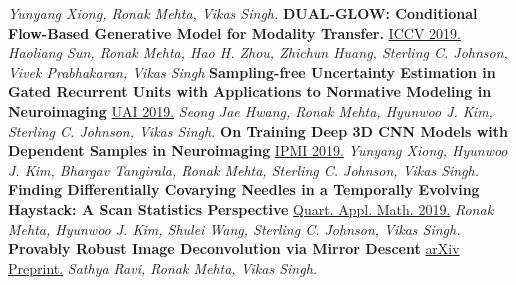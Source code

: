 \documentclass[]{article}
\begin{document}
\textit{Yunyang Xiong, Ronak Mehta, Vikas Singh.}
\newline\newline
{\bf  DUAL-GLOW: Conditional Flow-Based Generative Model for Modality Transfer.}
\newline
\href{http://openaccess.thecvf.com/content_ICCV_2019/html/Sun_DUAL-GLOW_Conditional_Flow-Based_Generative_Model_for_Modality_Transfer_ICCV_2019_paper.html}{ICCV 2019.}
\textit{Haoliang Sun, Ronak Mehta, Hao H. Zhou, Zhichun Huang, Sterling C. Johnson, Vivek Prabhakaran, Vikas Singh}
\newline\newline
{\bf Sampling-free Uncertainty Estimation in Gated Recurrent Units with Applications to Normative Modeling in Neuroimaging }
\newline
\href{http://auai.org/uai2019/proceedings/papers/296.pdf}{UAI 2019.}
\textit{Seong Jae Hwang, Ronak Mehta, Hyunwoo J. Kim, Sterling C. Johnson, Vikas Singh.}
\newline\newline
{\bf On Training Deep 3D CNN Models with Dependent Samples in Neuroimaging}
\newline
\href{https://link.springer.com/chapter/10.1007/978-3-030-20351-1_8}{IPMI 2019.}
\textit{Yunyang Xiong, Hyunwoo J. Kim, Bhargav Tangirala, Ronak Mehta, Sterling C. Johnson, Vikas Singh.}
\newline\newline
{\bf   Finding Differentially Covarying Needles in a Temporally Evolving Haystack: A Scan Statistics Perspective }
\newline
\href{https://www.ams.org/journals/qam/2019-77-02/S0033-569X-2018-01522-9/}{Quart. Appl. Math. 2019.}
\textit{Ronak Mehta, Hyunwoo J. Kim, Shulei Wang, Sterling C. Johnson, Vikas Singh.}
\newline\newline
{\bf Provably Robust Image Deconvolution via Mirror Descent}
\newline
\href{https://arxiv.org/abs/1803.08137}{arXiv Preprint.}
\textit{Sathya Ravi, Ronak Mehta, Vikas Singh.}
\fi
\end{document}
